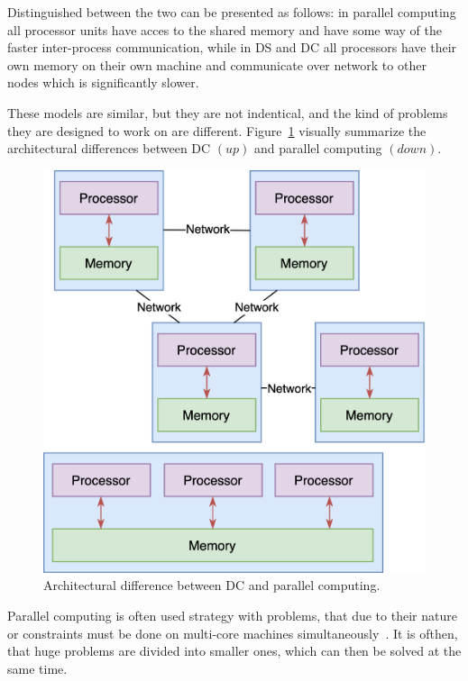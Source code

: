 Distinguished between the two can be presented as follows: in parallel computing all processor units have acces to the shared memory and have some way of the faster inter-process communication, while in DS and DC all processors have their own memory on their own machine and communicate over network to other nodes which is significantly slower. 

These models are similar, but they are not indentical, and the kind of problems they are designed to work on are different. Figure~\ref{fig:fig4} visually summarize the architectural  differences between DC $(up)$ and parallel computing $(down)$.

\begin{figure}[H]
	\begin{center}
		\includegraphics[scale=0.8]{images/Figure4.png}
	\end{center}
	\vspace{-0.6cm}
	\caption{Architectural difference between DC and parallel computing.}
	\label{fig:fig4}
\end{figure}

Parallel computing is often used strategy with problems, that due to their nature or constraints must be done on multi-core machines simultaneously~\cite{0072397}. It is ofthen, that huge problems are divided into smaller ones, which can then be solved at the same time. 

